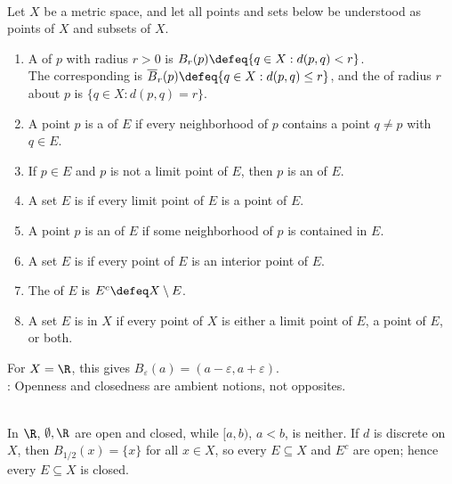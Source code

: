 \begin{definition} \label{def:metric-topology-core-definitions}\label{def:metric-topology-core-definitions-source-todo} \\
Let $X$ be a metric space, and let all points and sets below be understood as points of $X$ and subsets of $X$.
\begin{enumerate}[label=(\roman*)]
\setlength{\itemsep}{0pt}
\item A  of $p$ with radius $r>0$ is $B_r(p)\defeq\{q\in X:d(p,q)<r\}$.\\
The corresponding  is $\overline{B}_r(p)\defeq\{q\in X:d(p,q)\leq r\}$, and the  of radius $r$ about $p$ is $\{q\in X:d(p,q)=r\}$.
\item A point $p$ is a  of $E$ if every neighborhood of $p$ contains a point $q\neq p$ with $q\in E$.
\item If $p\in E$ and $p$ is not a limit point of $E$, then $p$ is an  of $E$.
\item A set $E$ is  if every limit point of $E$ is a point of $E$.
\item A point $p$ is an  of $E$ if some neighborhood of $p$ is contained in $E$.
\item A set $E$ is  if every point of $E$ is an interior point of $E$.
\item The  of $E$ is $E^c\defeq X\setminus E$.
\item A set $E$ is  in $X$ if every point of $X$ is either a limit point of $E$, a point of $E$, or both.
\end{enumerate}
For $X=\R$, this gives $B_\varepsilon(a)=(a-\varepsilon,a+\varepsilon)$.\\
: Openness and closedness are ambient notions, not opposites.
\end{definition}

\begin{example} \label{ex:open-closed-neither-and-both} \\
In $\R$, $\emptyset,\R$ are open and closed, while $[a,b)$, $a<b$, is neither. If $d$ is discrete on $X$, then $B_{1/2}(x)=\{x\}$ for all $x\in X$, so every $E\subseteq X$ and $E^c$ are open; hence every $E\subseteq X$ is closed.
\end{example}

